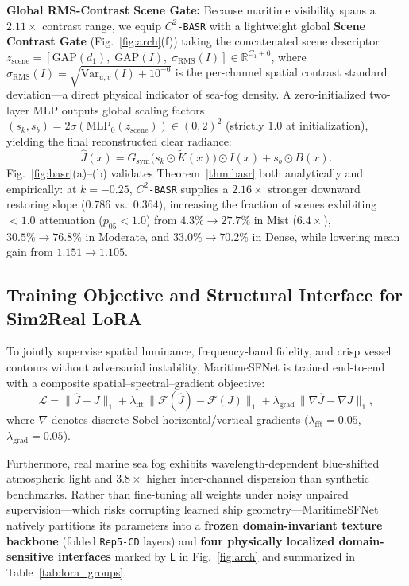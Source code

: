\documentclass[journal,twoside]{IEEEtran}
\begin{document}
\textbf{Global RMS-Contrast Scene Gate:} Because maritime visibility spans a $2.11\times$ contrast range, we equip \texttt{$C^2$-BASR} with a lightweight global \textbf{Scene Contrast Gate} (Fig.~\ref{fig:arch}(f)) taking the concatenated scene descriptor $z_{\mathrm{scene}} = [\mathrm{GAP}(d_1),\; \mathrm{GAP}(I),\; \sigma_{\mathrm{RMS}}(I)] \in \mathbb{R}^{C_1+6}$, where $\sigma_{\mathrm{RMS}}(I) = \sqrt{\mathrm{Var}_{u,v}(I) + 10^{-6}}$ is the per-channel spatial contrast standard deviation---a direct physical indicator of sea-fog density. A zero-initialized two-layer MLP outputs global scaling factors $(s_k, s_b) = 2\sigma(\mathrm{MLP}_0(z_{\mathrm{scene}}))\in(0,2)^2$ (strictly $1.0$ at initialization), yielding the final reconstructed clear radiance:
\begin{equation}
\hat{J}(x) = G_{\mathrm{sym}}\!\big(s_k \odot \tilde{K}(x)\big) \odot I(x) + s_b \odot B(x).
\label{eq:basr_final}
\end{equation}
Fig.~\ref{fig:basr}(a)--(b) validates Theorem~\ref{thm:basr} both analytically and empirically: at $k=-0.25$, \texttt{$C^2$-BASR} supplies a $2.16\times$ stronger downward restoring slope ($0.786$ vs.\ $0.364$), increasing the fraction of scenes exhibiting $<1.0$ attenuation ($p_{05}<1.0$) from $4.3\%\to 27.7\%$ in Mist ($6.4\times$), $30.5\%\to 76.8\%$ in Moderate, and $33.0\%\to 70.2\%$ in Dense, while lowering mean gain from $1.151\to 1.105$.

\subsection{Training Objective and Structural Interface for Sim2Real LoRA}
\label{sec:loss_lora}

To jointly supervise spatial luminance, frequency-band fidelity, and crisp vessel contours without adversarial instability, MaritimeSFNet is trained end-to-end with a composite spatial--spectral--gradient objective:
\begin{equation}
\mathcal{L} = \|\hat{J} - J\|_1 + \lambda_{\mathrm{fft}}\,\|\mathcal{F}(\hat{J}) - \mathcal{F}(J)\|_1 + \lambda_{\mathrm{grad}}\,\|\nabla \hat{J} - \nabla J\|_1,
\label{eq:loss}
\end{equation}
where $\nabla$ denotes discrete Sobel horizontal/vertical gradients ($\lambda_{\mathrm{fft}}=0.05$, $\lambda_{\mathrm{grad}}=0.05$).

Furthermore, real marine sea fog exhibits wavelength-dependent blue-shifted atmospheric light and $3.8\times$ higher inter-channel dispersion than synthetic benchmarks. Rather than fine-tuning all weights under noisy unpaired supervision---which risks corrupting learned ship geometry---MaritimeSFNet natively partitions its parameters into a \textbf{frozen domain-invariant texture backbone} (folded \texttt{Rep5-CD} layers) and \textbf{four physically localized domain-sensitive interfaces} marked by \texttt{L} in Fig.~\ref{fig:arch} and summarized in Table~\ref{tab:lora_groups}.
\end{document}
